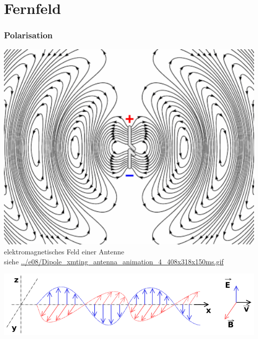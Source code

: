 \section*{Fernfeld}

\begin{frame}
  \frametitle{Polarisation}
  \begin{center}
    \begin{minipage}{0.45\textwidth}
        \includegraphics[width=1\textwidth,height=.6\textheight,keepaspectratio]{e08/Dipole_xmting_antenna_animation_4_408x318x150ms-2.png}\\
      {\tiny elektromagnetisches Feld einer Antenne \\
             siehe \url{../e08/Dipole_xmting_antenna_animation_4_408x318x150ms.gif}}
    \end{minipage}
    \begin{minipage}{0.45\textwidth}
      \includegraphics[width=\textwidth,height=.8\textheight,keepaspectratio]{e08/Onde_electromagnetique.png}\\

\end{minipage}
\end{center}
\end{frame}
